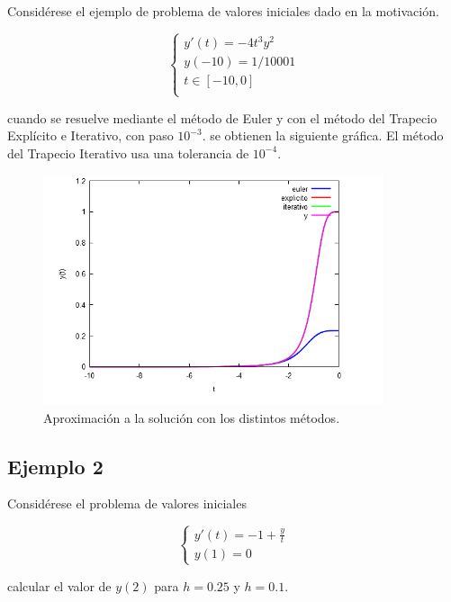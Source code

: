 \documentclass{article}
\theoremstyle{theorem-style}  %
\theoremstyle{definition-style}
\theoremstyle{example-style}
\begin{document}
Considérese el ejemplo de problema de valores iniciales dado en la motivación.

		\begin{equation*}
			\begin{cases}
			y'(t) = -4 t^3 y^2 \\
			y(-10) = 1/10001 \\
			t \in [-10,0] \\
			\end{cases}
		\end{equation*}

			cuando se resuelve mediante el método de Euler y con el método del Trapecio Explícito e Iterativo, con paso $10^{-3}$. se obtienen la siguiente gráfica. El método del Trapecio Iterativo usa una tolerancia de $10^{-4}$.

			\begin{figure}[H]
				\centering
				\includegraphics[width=10cm]{./Images/ej1.png}
				\caption{Aproximación a la solución con los distintos métodos.}
			\end{figure}

\subsection{Ejemplo 2} \label{ejemplo2}

Considérese el problema de valores iniciales

		\begin{equation*}
			\begin{cases}
			y'(t) = -1 + \frac{y}{t} \\
			y(1) = 0
			\end{cases}
		\end{equation*}

calcular el valor de $y(2)$ para $h=0.25$ y $h=0.1$.
\end{document}
